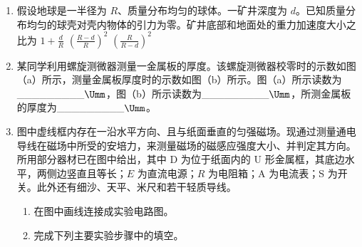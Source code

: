 \documentclass[\gkver]{gaokaozhenti}
\begin{document}
\begin{enumerate}
\item
假设地球是一半径为 $R$、质量分布均匀的球体。一矿井深度为 $d$。已知质量分布均匀的球壳对壳内物体的引力为零。矿井底部和地面处的重力加速度大小之比为
{$1+\frac{d}{R}$}
{$\left(\frac{R-d}{R}\right)^{2}$}
{$\left(\frac{R}{R-d}\right)^{2}$}

\item
某同学利用螺旋测微器测量一金属板的厚度。该螺旋测微器校零时的示数如图（a）所示，测量金属板厚度时的示数如图（b）所示。图（a）所示读数为\_\_\_\_\_\_\_\_\_$\Umm$，图（b）所示读数为\_\_\_\_\_\_\_\_\_$\Umm$，所测金属板的厚度为\_\_\_\_\_\_\_\_\_$\Umm$。

\item
图中虚线框内存在一沿水平方向、且与纸面垂直的匀强磁场。现通过测量通电导线在磁场中所受的安培力，来测量磁场的磁感应强度大小、并判定其方向。所用部分器材已在图中给出，其中 D 为位于纸面内的 U 形金属框，其底边水平，两侧边竖直且等长；$E$ 为直流电源；$R$ 为电阻箱；A 为电流表；S 为开关。此外还有细沙、天平、米尺和若干轻质导线。
\begin{enumerate}
	\item
	在图中画线连接成实验电路图。
	\item
	完成下列主要实验步骤中的填空。


\end{enumerate}
\end{enumerate}
\end{document}
